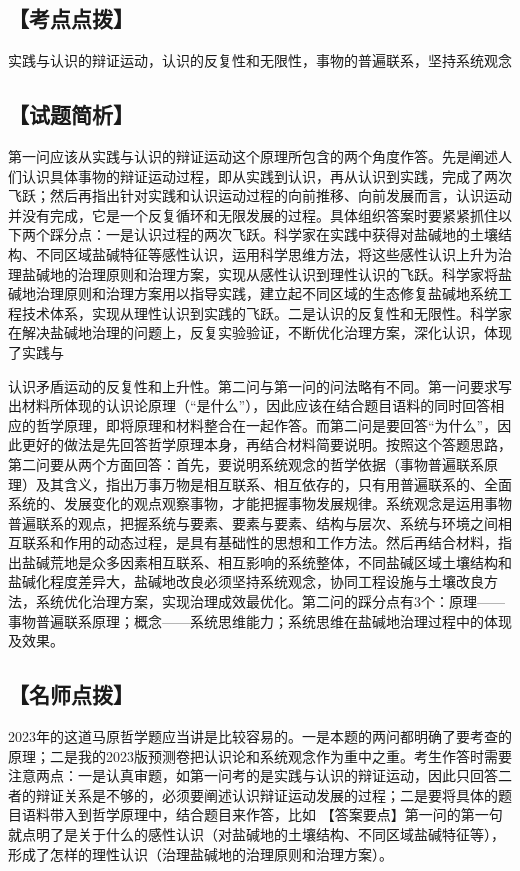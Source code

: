 \documentclass[UTF8,11pt]{ctexart}
\begin{document}
\subsection*{【考点点拨】}

实践与认识的辩证运动，认识的反复性和无限性，事物的普遍联系，坚持系统观念


\subsection*{【试题简析】}

第一问应该从实践与认识的辩证运动这个原理所包含的两个角度作答。先是阐述人们认识具体事物的辩证运动过程，即从实践到认识，再从认识到实践，完成了两次飞跃；然后再指出针对实践和认识运动过程的向前推移、向前发展而言，认识运动并没有完成，它是一个反复循环和无限发展的过程。具体组织答案时要紧紧抓住以下两个踩分点：一是认识过程的两次飞跃。科学家在实践中获得对盐碱地的土壤结构、不同区域盐碱特征等感性认识，运用科学思维方法，将这些感性认识上升为治理盐碱地的治理原则和治理方案，实现从感性认识到理性认识的飞跃。科学家将盐碱地治理原则和治理方案用以指导实践，建立起不同区域的生态修复盐碱地系统工程技术体系，实现从理性认识到实践的飞跃。二是认识的反复性和无限性。科学家在解决盐碱地治理的问题上，反复实验验证，不断优化治理方案，深化认识，体现了实践与


认识矛盾运动的反复性和上升性。第二问与第一问的问法略有不同。第一问要求写出材料所体现的认识论原理（“是什么”），因此应该在结合题目语料的同时回答相应的哲学原理，即将原理和材料整合在一起作答。而第二问是要回答“为什么”，因此更好的做法是先回答哲学原理本身，再结合材料简要说明。按照这个答题思路，第二问要从两个方面回答：首先，要说明系统观念的哲学依据（事物普遍联系原理）及其含义，指出万事万物是相互联系、相互依存的，只有用普遍联系的、全面系统的、发展变化的观点观察事物，才能把握事物发展规律。系统观念是运用事物普遍联系的观点，把握系统与要素、要素与要素、结构与层次、系统与环境之间相互联系和作用的动态过程，是具有基础性的思想和工作方法。然后再结合材料，指出盐碱荒地是众多因素相互联系、相互影响的系统整体，不同盐碱区域土壤结构和盐碱化程度差异大，盐碱地改良必须坚持系统观念，协同工程设施与土壤改良方法，系统优化治理方案，实现治理成效最优化。第二问的踩分点有3个：原理——事物普遍联系原理；概念——系统思维能力；系统思维在盐碱地治理过程中的体现及效果。


\subsection*{【名师点拨】}

2023年的这道马原哲学题应当讲是比较容易的。一是本题的两问都明确了要考查的原理；二是我的2023版预测卷把认识论和系统观念作为重中之重。考生作答时需要注意两点：一是认真审题，如第一问考的是实践与认识的辩证运动，因此只回答二者的辩证关系是不够的，必须要阐述认识辩证运动发展的过程；二是要将具体的题目语料带入到哲学原理中，结合题目来作答，比如 【答案要点】第一问的第一句就点明了是关于什么的感性认识（对盐碱地的土壤结构、不同区域盐碱特征等），形成了怎样的理性认识（治理盐碱地的治理原则和治理方案）。
\end{document}
